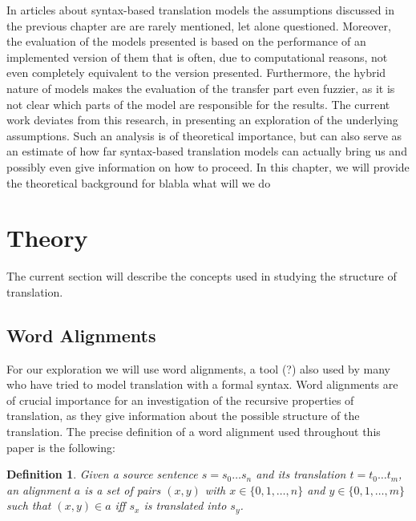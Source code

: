 \documentclass{report}
\theoremstyle{definition}
\theoremstyle{plain}
\newtheorem{definition}{Definition}
\begin{document}


In articles about syntax-based translation models the assumptions discussed in the previous chapter are are rarely mentioned, let alone questioned. Moreover, the evaluation of the models presented is based on the performance of an implemented version of them that is often, due to computational reasons, not even completely equivalent to the version presented. Furthermore, the hybrid nature of models makes the evaluation of the transfer part even fuzzier, as it is not clear which parts of the model are responsible for the results. The current work deviates from this research, in presenting an exploration of the underlying assumptions. Such an analysis is of theoretical importance, but can also serve as an estimate of how far syntax-based translation models can actually bring us and possibly even give information on how to proceed. In this chapter, we will provide the theoretical background for 
blabla what will we do

\section{Theory}

The current section will describe the concepts used in studying the structure of translation.

\subsection{Word Alignments}

 For our exploration we will use word alignments, a tool (?) also used by many who have tried to model translation with a formal syntax. Word alignments are of crucial importance for an investigation of the recursive properties of translation, as they give information about the possible structure of the translation. The precise definition of a word alignment used throughout this paper is the following:

\begin{definition}
Given a source sentence $s = s_0 \ldots s_n$ and its translation $t = t_0 \ldots t_m$, an alignment $a$ is a set of pairs $(x,y)$ with $x\in \{0,1,\ldots,n\}$ and $y\in \{0,1,\ldots,m\}$ such that $(x,y)\in a$ iff $s_x$ is translated into $s_y$.
\end{definition}
\end{document}
